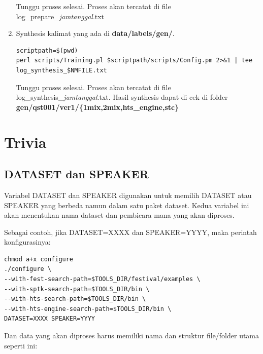\documentclass[12pt,]{article}
\begin{document}
\begin{enumerate}
		Tunggu proses selesai.
		Proses akan tercatat di file log\_prepare\_\textit{jamtanggal}.txt
		
		\item Synthesis kalimat yang ada di \textbf{data/labels/gen/}.
		\begin{verbatim}
scriptpath=$(pwd)
perl scripts/Training.pl $scriptpath/scripts/Config.pm 2>&1 | tee log_synthesis_$NMFILE.txt
		\end{verbatim}
		
		Tunggu proses selesai.
		Proses akan tercatat di file log\_synthesis\_\textit{jamtanggal}.txt.
		Hasil synthesis dapat di cek di folder \textbf{gen/qst001/ver1/\{1mix,2mix,hts\_engine,stc\}}
		
	\end{enumerate}
		
	\newpage
	\section{Trivia}
	
	\subsection{DATASET dan SPEAKER}
	
	Variabel DATASET dan SPEAKER digunakan untuk memilih DATASET atau SPEAKER yang berbeda namun dalam satu paket dataset.
	Kedua variabel ini akan menentukan nama dataset dan pembicara mana yang akan diproses.
	
	Sebagai contoh, jika DATASET=XXXX dan SPEAKER=YYYY, maka perintah konfigurasinya:
	
	\begin{verbatim}
chmod a+x configure
./configure \
--with-fest-search-path=$TOOLS_DIR/festival/examples \
--with-sptk-search-path=$TOOLS_DIR/bin \
--with-hts-search-path=$TOOLS_DIR/bin \
--with-hts-engine-search-path=$TOOLS_DIR/bin \
DATASET=XXXX SPEAKER=YYYY
	\end{verbatim}
	
	Dan data yang akan diproses harus memiliki nama dan struktur file/folder utama seperti ini:
	
\end{document}
